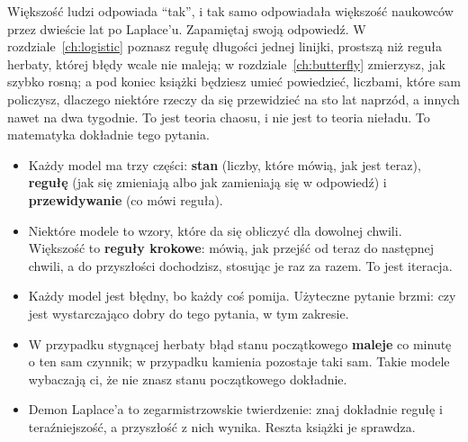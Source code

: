 \noindent
Większość ludzi odpowiada \enquote{tak}, i tak samo odpowiadała większość
naukowców przez dwieście lat po Laplace'u. Zapamiętaj swoją odpowiedź. W
rozdziale~\ref{ch:logistic} poznasz regułę długości jednej linijki, prostszą
niż reguła herbaty, której błędy wcale nie maleją; w
rozdziale~\ref{ch:butterfly} zmierzysz, jak szybko rosną; a pod koniec
książki będziesz umieć powiedzieć, liczbami, które sam policzysz, dlaczego
niektóre rzeczy da się przewidzieć na sto lat naprzód, a innych nawet na
dwa tygodnie. To jest teoria chaosu, i nie jest to teoria nieładu. To
matematyka dokładnie tego pytania.

\begin{summarybox}
\begin{itemize}
\item Każdy model ma trzy części: \textbf{stan} (liczby, które mówią, jak
  jest teraz), \textbf{regułę} (jak się zmieniają albo jak zamieniają się w
  odpowiedź) i \textbf{przewidywanie} (co mówi reguła).
\item Niektóre modele to wzory, które da się obliczyć dla dowolnej chwili.
  Większość to \textbf{reguły krokowe}: mówią, jak przejść od teraz do
  następnej chwili, a do przyszłości dochodzisz, stosując je raz za razem.
  To jest iteracja.
\item Każdy model jest błędny, bo każdy coś pomija. Użyteczne pytanie brzmi:
  czy jest wystarczająco dobry do tego pytania, w tym zakresie.
\item W przypadku stygnącej herbaty błąd stanu początkowego \textbf{maleje}
  co minutę o ten sam czynnik; w przypadku kamienia pozostaje taki sam.
  Takie modele wybaczają ci, że nie znasz stanu początkowego dokładnie.
\item Demon Laplace'a to zegarmistrzowskie twierdzenie: znaj dokładnie
  regułę i teraźniejszość, a przyszłość z nich wynika. Reszta książki je
  sprawdza.
\end{itemize}
\end{summarybox}

\canyou

